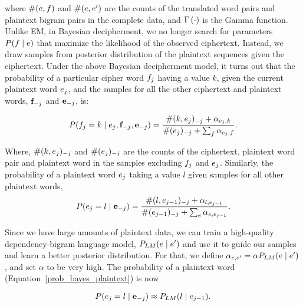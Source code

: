 where $\#(e,f)$ and $\#(e,e')$ are the counts of the translated word pairs and plaintext bigram pairs in the complete data, and $\Gamma \left( \cdot \right)$ is the Gamma function. Unlike EM, in Bayesian decipherment, we no longer search for parameters $P(f \mid e)$ that maximize the likelihood of the observed ciphertext. Instead, we draw samples from posterior distribution of the plaintext sequences given the ciphertext. Under the above Bayesian decipherment model, it turns out  that the probability of a particular cipher word $f_{j}$ having a value $k$, given the current plaintext word $e_j$, and  the samples for all the other ciphertext and plaintext words, $\mathbf{f}_{-j}$ and $\mathbf{e}_{-j}$, is:

\begin{equation} \label{prob_bayes_ciphertext}
P(f_j = k \mid e_j,\mathbf{f}_{-j}, \mathbf{e}_{-j}) = \frac{\#(k, e_j)_{-j} + \alpha_{e_j,k}}{\#(e_j)_{-j}+\sum_{f} \alpha_{e_j,f}}.
\end{equation}

Where, $\#(k, e_j)_{-j}$ and $\#(e_j)_{-j}$ are the counts of the ciphertext, plaintext word pair and plaintext word in the samples excluding $f_j$ and $e_j$. Similarly, the probability of a plaintext word $e_j$ taking a value $l$ given samples for all other plaintext words, 
\begin{equation} \label{prob_bayes_plaintext}
P(e_j = l \mid \mathbf{e}_{-j}) = \frac{\#(l, e_{j-1})_{-j} + \alpha_{l,e_{j-1}}} {\#(e_{j-1})_{-j} + \sum_{e} \alpha_{e,e_{j-1}}}.
\end{equation}



Since we have large amounts of plaintext data, we can train a high-quality dependency-bigram language model, $P_{LM}(e \mid e')$ and use it to guide our samples and learn a better posterior distribution. For that, we define $\alpha_{e,e'} = \alpha P_{LM}(e \mid e')$, and set $\alpha$ to be very high. The probability of a plaintext word (Equation~\ref{prob_bayes_plaintext}) is now

\begin{equation} \label{prob_bayes_plaintext_lm}
P(e_j = l \mid \mathbf{e}_{-j}) \approx P_{LM}(l \mid e_{j-1}).
\end{equation}

